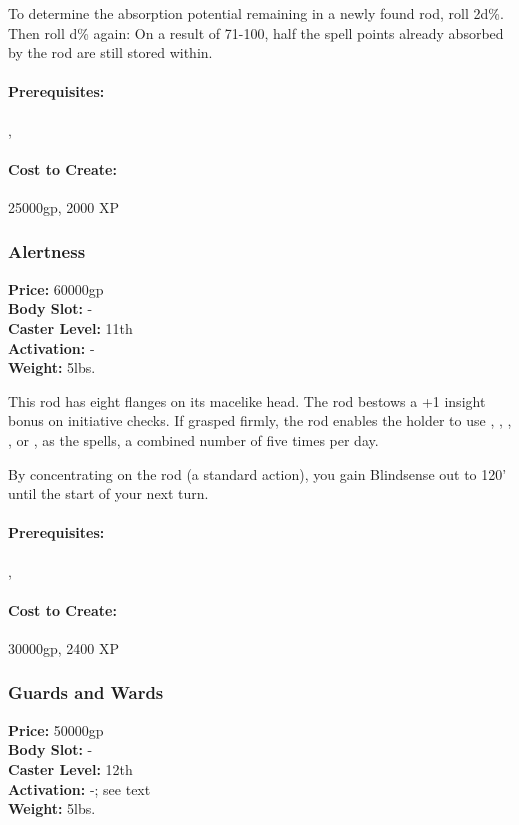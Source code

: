 To determine the absorption potential remaining in a newly found rod, roll 2d\%. Then roll d\% again: On a result of 71-100, half the spell points already absorbed by the rod are still stored within.

\paragraph{Prerequisites:} , 

\paragraph{Cost to Create:} 25000gp, 2000 XP

\subsubsection{Alertness}
\textbf{Price:} 60000gp\\
\textbf{Body Slot:} -\\
\textbf{Caster Level:} 11th\\
\textbf{Activation:} -\\
\textbf{Weight:} 5lbs.

This rod has eight flanges on its macelike head. 
The rod bestows a +1 insight bonus on initiative checks. 
If grasped firmly, the rod enables the holder to use , , , , or , as the spells, a combined number of five times per day. 

By concentrating on the rod (a standard action), you gain Blindsense out to 120' until the start of your next turn.

\paragraph{Prerequisites:} , 

\paragraph{Cost to Create:} 30000gp, 2400 XP
\subsubsection{Guards and Wards}
\textbf{Price:} 50000gp\\
\textbf{Body Slot:} -\\
\textbf{Caster Level:} 12th\\
\textbf{Activation:} -; see text\\
\textbf{Weight:} 5lbs.

